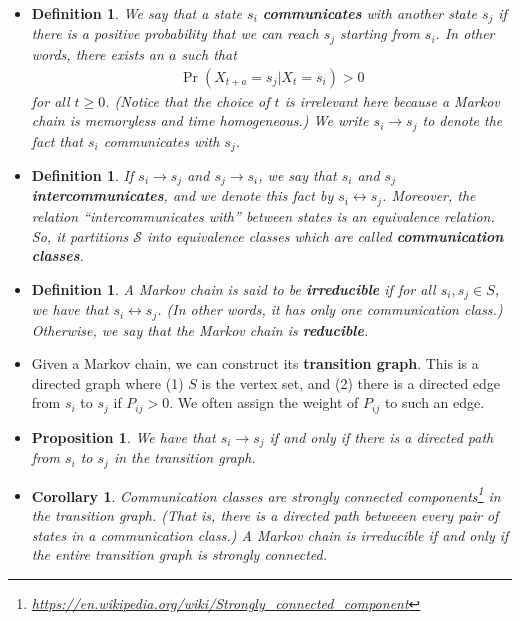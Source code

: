 \documentclass[10pt]{article}
\newtheorem{definition}[lemma]{Definition}
\newtheorem{proposition}[lemma]{Proposition}
\newtheorem{corollary}[lemma]{Corollary}
\begin{document}
\begin{itemize}
  \item \begin{definition}
    We say that a state $s_i$ {\bf communicates} with another state $s_j$ if there is a positive probability that we can reach $s_j$ starting from $s_i$. In other words, there exists an $a$ such that
    \begin{align*}
        \Pr(X_{t+a} = s_j|X_t=s_i) > 0
    \end{align*}
    for all $t \geq 0$. (Notice that the choice of $t$ is irrelevant here because a Markov chain is memoryless and time homogeneous.) We write $s_i \rightarrow s_j$ to denote the fact that $s_i$ communicates with $s_j$.
  \end{definition}

  \item \begin{definition}
    If $s_i \rightarrow s_j$ and $s_j \rightarrow s_i$, we say that $s_i$ and $s_j$ {\bf intercommunicates}, and we denote this fact by $s_i \leftrightarrow s_j$. Moreover, the relation ``intercommunicates with'' between states is an equivalence relation. So, it partitions $\mathcal{S}$ into equivalence classes which are called {\bf communication classes}.
  \end{definition}

  \item \begin{definition}
    A Markov chain is said to be {\bf irreducible} if for all $s_i, s_j \in S$, we have that $s_i \leftrightarrow s_j$. (In other words, it has only one communication class.) Otherwise, we say that the Markov chain is {\bf reducible}.
  \end{definition}

  \item Given a Markov chain, we can construct its {\bf transition graph}. This is a directed graph where (1) $S$ is the vertex set, and (2) there is a directed edge from $s_i$ to $s_j$ if $P_{ij} > 0$. We often assign the weight of $P_{ij}$ to such an edge.
  
  \item \begin{proposition}
    We have that $s_i \rightarrow s_j$ if and only if there is a directed path from $s_i$ to $s_j$ in the transition graph.
  \end{proposition}

  \item \begin{corollary}
    Communication classes are strongly connected components\footnote{\url{https://en.wikipedia.org/wiki/Strongly_connected_component}} in the transition graph. (That is, there is a directed path betweeen every pair of states in a communication class.) A Markov chain is irreducible if and only if the entire transition graph is strongly connected.
  \end{corollary}
\end{itemize}
\end{document}
